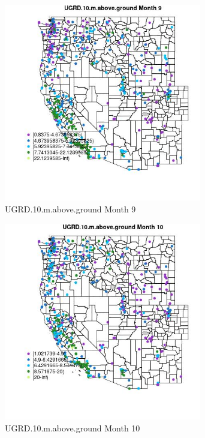 \begin{figure} 
\centering  
\includegraphics[width=0.77\textwidth]{Code_Outputs/ML_input_report_ML_input_PM25_Step5_part_d_de_duplicated_aves_ML_input_MapObsMo9UGRD10maboveground.jpg} 
\caption{\label{fig:ML_input_report_ML_input_PM25_Step5_part_d_de_duplicated_aves_ML_inputMapObsMo9UGRD10maboveground}UGRD.10.m.above.ground Month 9} 
\end{figure} 
 

\begin{figure} 
\centering  
\includegraphics[width=0.77\textwidth]{Code_Outputs/ML_input_report_ML_input_PM25_Step5_part_d_de_duplicated_aves_ML_input_MapObsMo10UGRD10maboveground.jpg} 
\caption{\label{fig:ML_input_report_ML_input_PM25_Step5_part_d_de_duplicated_aves_ML_inputMapObsMo10UGRD10maboveground}UGRD.10.m.above.ground Month 10} 
\end{figure} 
 

